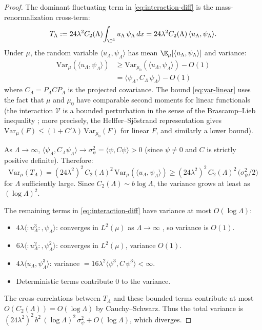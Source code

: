 \begin{proof}
The dominant fluctuating term in \eqref{eq:interaction-diff} is the
mass-renormalization cross-term:
\[
  T_\Lambda := 24\lambda^2 C_2(\Lambda)\!\int_{\T^3} u_\Lambda\,\psi_\Lambda\,dx
  = 24\lambda^2 C_2(\Lambda)\,\langle u_\Lambda, \psi_\Lambda\rangle.
\]
Under $\mu$, the random variable $\langle u_\Lambda, \psi_\Lambda\rangle$ has
mean $\E_\mu[\langle u_\Lambda,\psi_\Lambda\rangle]$ and variance:
\begin{align}
  \mathrm{Var}_\mu(\langle u_\Lambda,\psi_\Lambda\rangle)
  &\geq \mathrm{Var}_{\mu_0}(\langle u_\Lambda,\psi_\Lambda\rangle)
    - O(1) \nonumber\\
  &= \langle\psi_\Lambda, C_\Lambda\,\psi_\Lambda\rangle - O(1)
    \label{eq:var-linear}
\end{align}
where $C_\Lambda = P_\Lambda C P_\Lambda$ is the projected covariance. The
bound \eqref{eq:var-linear} uses the fact that $\mu$ and $\mu_0$ have
comparable second moments for linear functionals (the interaction $\mathcal{V}$
is a bounded perturbation in the sense of the Brascamp--Lieb inequality
\cite{BL76}; more precisely, the Helffer--Sj\"ostrand representation gives
$\mathrm{Var}_\mu(F) \leq (1 + C'\lambda)\,\mathrm{Var}_{\mu_0}(F)$ for
linear $F$, and similarly a lower bound).

As $\Lambda \to \infty$, $\langle\psi_\Lambda, C_\Lambda\psi_\Lambda\rangle
\to \sigma_\psi^2 = \langle\psi, C\psi\rangle > 0$ (since $\psi \neq 0$
and $C$ is strictly positive definite). Therefore:
\[
  \mathrm{Var}_\mu(T_\Lambda)
  = (24\lambda^2)^2\,C_2(\Lambda)^2\,\mathrm{Var}_\mu(\langle u_\Lambda,\psi_\Lambda\rangle)
  \geq (24\lambda^2)^2\,C_2(\Lambda)^2\,\bigl(\sigma_\psi^2/2\bigr)
\]
for $\Lambda$ sufficiently large. Since $C_2(\Lambda) \sim b\log\Lambda$,
the variance grows at least as $(\log\Lambda)^2$.

The remaining terms in \eqref{eq:interaction-diff} have variance at most
$O(\log\Lambda)$:
\begin{itemize}
\item $4\lambda\langle {:}u_\Lambda^3{:},\psi_\Lambda\rangle$: converges in
  $L^2(\mu)$ as $\Lambda \to \infty$ \cite{GH21}, so variance is $O(1)$.
\item $6\lambda\langle {:}u_\Lambda^2{:},\psi_\Lambda^2\rangle$: converges in
  $L^2(\mu)$, variance $O(1)$.
\item $4\lambda\langle u_\Lambda,\psi_\Lambda^3\rangle$: variance
  $= 16\lambda^2\langle\psi^3, C\,\psi^3\rangle < \infty$.
\item Deterministic terms contribute $0$ to the variance.
\end{itemize}
The cross-correlations between $T_\Lambda$ and these bounded terms contribute
at most $O(C_2(\Lambda)) = O(\log\Lambda)$ by Cauchy--Schwarz. Thus the
total variance is $(24\lambda^2)^2\,b^2\,(\log\Lambda)^2\,\sigma_\psi^2
+ O(\log\Lambda)$, which diverges.
\end{proof}

